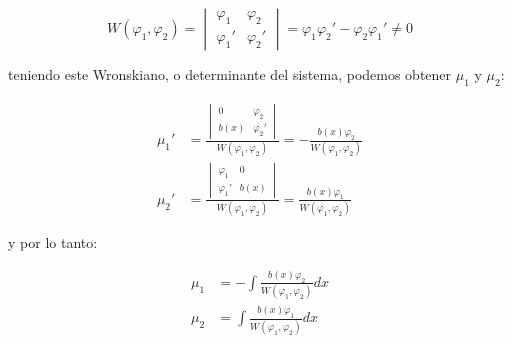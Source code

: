 		\begin{equation}
			W(\varphi_1, \varphi_2) =
			\begin{vmatrix}
				\varphi_1 & \varphi_2 \\
				\varphi_1' & \varphi_2'
			\end{vmatrix} = \varphi_1 \varphi_2' - \varphi_2 \varphi_1' \ne 0
		\end{equation}

		teniendo este Wronskiano, o determinante del sistema, podemos obtener $\mu_1$ y $\mu_2$:

		\begin{align*}
			\mu_1' &= \frac{\begin{vmatrix} 0 & \varphi_2 \\ b(x) & \varphi_2' \end{vmatrix}}{W(\varphi_1, \varphi_2)} = -\frac{b(x) \varphi_2}{W(\varphi_1, \varphi_2)} \\
			\mu_2' &= \frac{\begin{vmatrix} \varphi_1 & 0 \\ \varphi_1' & b(x) \end{vmatrix}}{W(\varphi_1, \varphi_2)} = \frac{b(x) \varphi_1}{W(\varphi_1, \varphi_2)}
		\end{align*}

		y por lo tanto:

		\begin{align*}
			\mu_1 &= - \int \frac{b(x) \varphi_2}{W(\varphi_1, \varphi_2)} dx \\
			\mu_2 &= \int \frac{b(x) \varphi_1}{W(\varphi_1, \varphi_2)} dx
		\end{align*}

